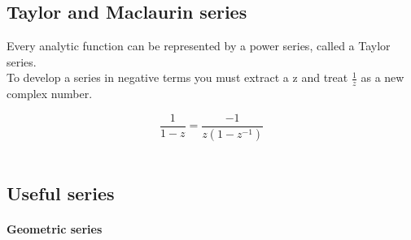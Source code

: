 \subsection{Taylor and Maclaurin series}
Every analytic function can be represented by a power series, called a
Taylor series.\\

To develop a series in negative terms you must extract a z and treat
$\frac{1}{z}$ as a new complex number.

\begin{equation}
  \frac{1}{1-z} = \frac{-1}{z(1-z^{-1})}
\end{equation} \\


\subsection{Useful series}

\paragraph{Geometric series}
